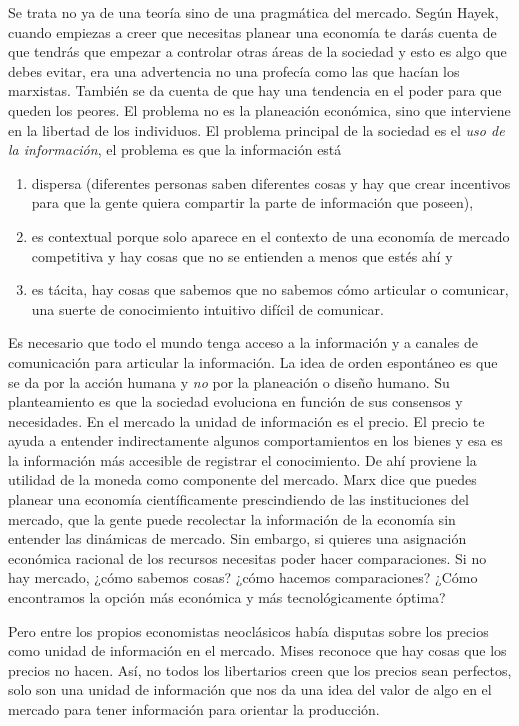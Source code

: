 Se trata no ya de una teoría sino de una pragmática del mercado. Según Hayek, cuando empiezas a creer que necesitas planear una economía te darás cuenta de que tendrás que empezar a controlar otras áreas de la sociedad y esto es algo que debes evitar, era una advertencia no una profecía como las que hacían los marxistas. También se da cuenta de que hay una tendencia en el poder para que queden los peores. El problema no es la planeación económica, sino que interviene en la libertad de los individuos. El problema principal de la sociedad es el \emph{uso de la información}, el problema es que la información está 

\begin{enumerate}
  \item dispersa (diferentes personas saben diferentes cosas y hay que crear incentivos para que la gente quiera compartir la parte de información que poseen), 
  \item es contextual porque solo aparece en el contexto de una economía de mercado competitiva y hay cosas que no se entienden a menos que estés ahí y 
  \item es tácita, hay cosas que sabemos que no sabemos cómo articular o comunicar, una suerte de conocimiento intuitivo difícil de comunicar.
\end{enumerate}

Es necesario que todo el mundo tenga acceso a la información y a canales de comunicación para articular la información. La idea de orden espontáneo es que se da por la acción humana y \emph{no} por la planeación o diseño humano. Su planteamiento es que la sociedad evoluciona en función de sus consensos y necesidades. En el mercado la unidad de información es el precio. El precio te ayuda a entender indirectamente algunos comportamientos en los bienes y esa es la información más accesible de registrar el conocimiento. De ahí proviene la utilidad de la moneda como componente del mercado. Marx dice que puedes planear una economía científicamente prescindiendo de las instituciones del mercado, que la gente puede recolectar la información de la economía sin entender las dinámicas de mercado. Sin embargo, si quieres una asignación económica racional de los recursos necesitas poder hacer comparaciones. Si no hay mercado, ¿cómo sabemos cosas? ¿cómo hacemos comparaciones? ¿Cómo encontramos la opción más económica y más tecnológicamente óptima?

Pero entre los propios economistas neoclásicos había disputas sobre los precios como unidad de información en el mercado. Mises reconoce que hay cosas que los precios no hacen. Así, no todos los libertarios creen que los precios sean perfectos, solo son una unidad de información que nos da una idea del valor de algo en el mercado para tener información para orientar la producción.

